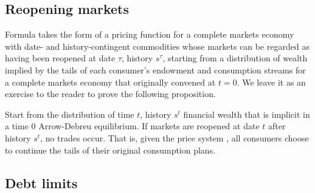 





\subsection{Reopening markets}

Formula   takes the form of a pricing
function for a complete markets economy with date- and history-contingent
commodities whose markets can be regarded as having been reopened at date $\tau$, history
$s^\tau$, starting from a distribution of   wealth  implied by the tails of each consumer's
endowment and consumption streams for a complete markets economy that originally convened at $t=0$.
 We leave it as an exercise to the
reader to prove the following proposition.


\medskip
{} Start from the distribution of time
$t$, history $s^t$ financial wealth that is implicit in a time $0$ Arrow-Debreu
equilibrium. If markets are reopened at date $t$ after history
$s^t$, no trades  occur. That is,  given the  price system
, all consumers choose to continue the  tails of their
original consumption plans.
\medskip
{}






 
\subsection{Debt limits}


